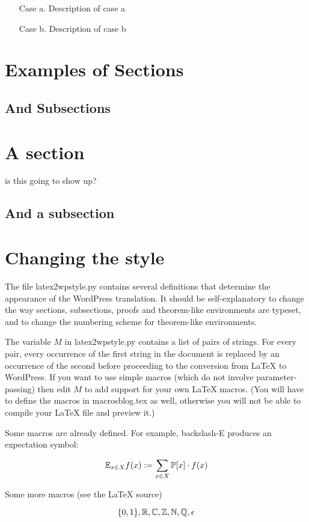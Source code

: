 \documentclass[12pt]{article}
\begin{document}
\begin{itemize}
\item [Case a.] Description of case a
\item [Case b.] Description of case b
\end{itemize}

\section*{Examples of Sections}

\subsection*{And Subsections}

\section{A section}
\label{sec}
{is this going to show up?}

\subsection{And a subsection}

\section{Changing the style}

The file latex2wpstyle.py contains several definitions that determine
the appearance of the WordPress translation. It should be self-explanatory
to change the way sections, subsections, proofs and theorem-like
environments are typeset, and to change the numbering scheme
for theorem-like environments.

The variable $M$ in latex2wpstyle.py contains a list of pairs of strings.
For every pair, every occurrence of the first string in the document is
replaced by an occurrence of the second before proceeding to the
conversion from LaTeX to WordPress. If you want to use simple macros
(which do not involve parameter-passing) then edit $M$ to add support
for your own LaTeX macros. (You will have to define the macros in
macrosblog.tex as well, otherwise you will not be able to compile
your LaTeX file and preview it.)

Some macros are already defined. For example, backslash-E produces
an expectation symbol:

\[ {\mathbb E}_{x \in X} f(x) := \sum_{x\in X} {\mathbb P} [x] \cdot f(x) \]

Some more macros (see the LaTeX source)

\[ \{0,1\}, {\mathbb R} , {\mathbb C}, {\mathbb Z}, {\mathbb N} , {\mathbb Q},  {\epsilon} \]
\end{document}
